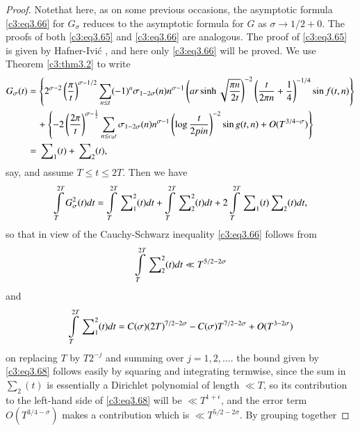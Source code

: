 \begin{proof}
  Note\pageoriginale that here, as on some previous occasions, the
  asymptotic formula \eqref{c3:eq3.66} for $G_\sigma$ reduces to the
  asymptotic formula for $G$ as $\sigma \to 1/2 +0$. The proofs of
  both \eqref{c3:eq3.65} and \eqref{c3:eq3.66} are analogous. The
  proof of \eqref{c3:eq3.65} is given by Hafner-Ivi\'c \cite{Hafner and Ivic1}, and
  here only \eqref{c3:eq3.66} will be proved. We use Theorem
  \ref{c3:thm3.2} to write
{\fontsize{8}{10}\selectfont
  \begin{align*}
    G_\sigma (t) & = \left\{ 2^{\sigma-2} \left(\frac{\pi}{t}
    \right)^{\sigma-1/2} \sum_{n \leq t} (-1)^n \sigma_{1- 2
      \sigma}(n) n^{\sigma-1} \left( ar \sinh \sqrt{\frac{\pi
        n}{2t}}\right)^{-2} \left(\frac{t}{2 \pi n} + \frac{1}{4}
    \right)^{-1/4} \sin f(t, n)\right\}\\
    &\quad + \left\{ -2 \left(\frac{2 \pi}{t} \right)^{\sigma- \frac{1}{2}}
    \sum_{n \leq c_0 t}\sigma_{1-2 \sigma}(n) n^{\sigma-1} \left(\log
    \frac{t}{2 pi n} \right)^{-2} \sin g (t, n)+
    O(T^{3/4-\sigma})\right\}\\
    & = \sideset{}{_1}\sum (t) + \sideset{}{_2}\sum (t),
  \end{align*}}
  say, and assume $T \leq t\leq 2T$. Then we have
  $$
  \int\limits_T^{2T} G_\sigma^2 (t) dt = \int\limits_T^{2T}
  \sideset{}{_1^2}\sum (t) dt + \int\limits_T^{2T}
  \sideset{}{_2^2}\sum (t) dt + 2 \int\limits_T^{2T}
  \sideset{}{_1}\sum (t) \sideset{}{_2}\sum (t) dt,
  $$
  so that in view of the Cauchy-Schwarz inequality \eqref{c3:eq3.66}
  follows from 
  \begin{equation}
    \int\limits_T^{2T} \sideset{}{_2^2}\sum (t) dt \ll T^{5/2- 2
      \sigma}\label{c3:eq3.68} 
  \end{equation}
  and 
  \begin{equation}
    \int\limits_T^{2T} \sideset{}{_1^2}\sum (t) dt = C(\sigma)
    (2T)^{7/2-2\sigma} - C (\sigma)T^{7/2-2\sigma} +
    O(T^{3-2\sigma})\label{c3:eq3.69}  
  \end{equation}
  on replacing $T$ by $T2^{-j}$ and summing over $j= 1, 2,
  \ldots$. the bound given by \eqref{c3:eq3.68} follows easily by
  squaring and integrating termwise, since the sum in $\sum_2(t)$ is
  essentially a Dirichlet polynomial of length $\ll T$, so its
  contribution to the left-hand side of \eqref{c3:eq3.68} will be $\ll
  T^{1+ \epsilon}$, and the error term $O(T^{3/4-\sigma})$ makes a
  contribution which is $\ll T^{5/2-2\sigma}$. By grouping together

\end{proof}
